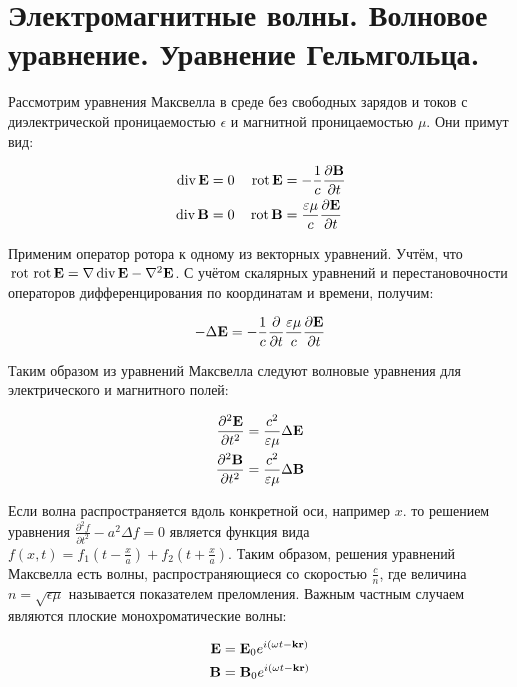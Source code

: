 \section{Электромагнитные волны. Волновое уравнение. Уравнение Гельмгольца.}

Рассмотрим уравнения Максвелла в среде без свободных зарядов и токов с диэлектрической проницаемостью $\epsilon$ и магнитной проницаемостью $\mu$. Они примут вид:

\begin{align*}
    \, \text{div} \, \mathbf E &= 0 & \, \text{rot} \, \mathbf E &= - \frac{1}{c} \frac{\partial \mathbf B}{\partial t} \\
    \, \text{div} \, \mathbf B &= 0 & \, \text{rot} \, \mathbf B &= \frac{\varepsilon \mu}{c} \frac{\partial \mathbf E}{\partial t}
\end{align*}

\noindent
Применим оператор ротора к одному из векторных уравнений. Учтём, что $\, \text{rot} \, \, \text{rot} \, \mathbf E = \nabla \, \text{div} \, \mathbf E - \nabla^2 \mathbf E$. С учётом скалярных уравнений и перестановочности операторов дифференцирования по координатам и времени, получим:

\begin{equation*}
    - \Delta \mathbf E = -\frac{1}{c} \frac{\partial}{\partial t} \frac{\varepsilon \mu}{c} \frac{\partial \mathbf E}{\partial t}
\end{equation*}

\noindent
Таким образом из уравнений Максвелла следуют волновые уравнения для электрического и магнитного полей:

\begin{align}
    \frac{\partial^2 \mathbf E}{\partial t^2} &= \frac{c^2}{\varepsilon \mu} \Delta \mathbf E \\
    \frac{\partial^2 \mathbf B}{\partial t^2} &= \frac{c^2}{\varepsilon \mu} \Delta \mathbf B
\end{align}

Если волна распространяется вдоль конкретной оси, например $x$. то решением уравнения $\frac{\partial^2 f}{\partial t^2} - a^2 \Delta f = 0$ является функция вида $f(x, t) = f_1 (t - \frac{x}{a}) + f_2(t + \frac{x}{a})$. Таким образом, решения уравнений Максвелла есть волны, распространяющиеся со скоростью $\frac{c}{n}$, где величина $n = \sqrt{\epsilon \mu}$ называется показателем преломления. Важным частным случаем являются плоские монохроматические волны:

\begin{align}
    \mathbf E &= \mathbf E_0 e^{i \left( \omega t - \mathbf k \mathbf r \right)} \\
    \mathbf B &= \mathbf B_0 e^{i \left( \omega t - \mathbf k \mathbf r \right)}
\end{align}

